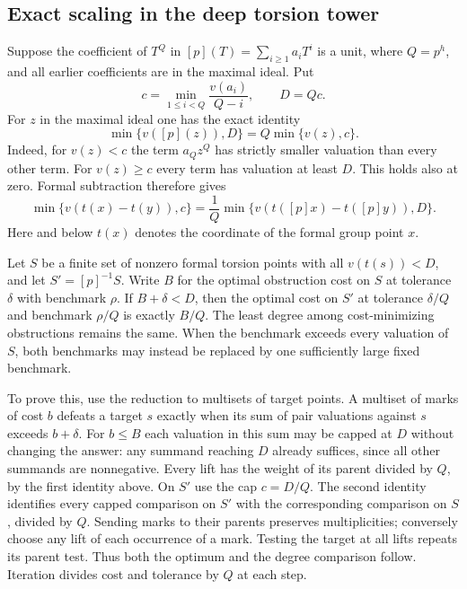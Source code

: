\subsection{Exact scaling in the deep torsion tower}
Suppose the coefficient of $T^Q$ in $[p](T)=\sum_{i\ge1} a_iT^i$ is a unit, where $Q=p^h$, and all earlier coefficients are in the maximal ideal. Put
\[
 c=\min_{1\le i<Q}\frac{v(a_i)}{Q-i}, \qquad D=Qc.
\]
For $z$ in the maximal ideal one has the exact identity
\[
         \min\{v([p](z)),D\}=Q\min\{v(z),c\}.
\]
Indeed, for $v(z)<c$ the term $a_Q z^Q$ has strictly smaller valuation than every other term. For $v(z)\ge c$ every term has valuation at least $D$. This holds also at zero. Formal subtraction therefore gives
\[
 \min\{v(t(x)-t(y)),c\}
  =\frac1Q\min\{v(t([p]x)-t([p]y)),D\}.
\]
Here and below $t(x)$ denotes the coordinate of the formal group point $x$.

Let $S$ be a finite set of nonzero formal torsion points with all $v(t(s))<D$, and let $S'=[p]^{-1}S$. Write $B$ for the optimal obstruction cost on $S$ at tolerance $\delta$ with benchmark $\rho$. If $B+\delta<D$, then the optimal cost on $S'$ at tolerance $\delta/Q$ and benchmark $\rho/Q$ is exactly $B/Q$. The least degree among cost-minimizing obstructions remains the same. When the benchmark exceeds every valuation of $S$, both benchmarks may instead be replaced by one sufficiently large fixed benchmark.

To prove this, use the reduction to multisets of target points. A multiset of marks of cost $b$ defeats a target $s$ exactly when its sum of pair valuations against $s$ exceeds $b+\delta$. For $b\le B$ each valuation in this sum may be capped at $D$ without changing the answer: any summand reaching $D$ already suffices, since all other summands are nonnegative. Every lift has the weight of its parent divided by $Q$, by the first identity above. On $S'$ use the cap $c=D/Q$. The second identity identifies every capped comparison on $S'$ with the corresponding comparison on $S$, divided by $Q$. Sending marks to their parents preserves multiplicities; conversely choose any lift of each occurrence of a mark. Testing the target at all lifts repeats its parent test. Thus both the optimum and the degree comparison follow. Iteration divides cost and tolerance by $Q$ at each step.

